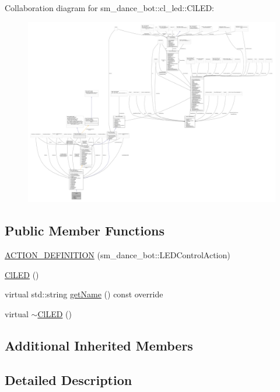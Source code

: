 Collaboration diagram for sm\+\_\+dance\+\_\+bot\+:\+:cl\+\_\+led\+:\+:Cl\+L\+ED\+:
\nopagebreak
\begin{figure}[H]
\begin{center}
\leavevmode
\includegraphics[width=350pt]{classsm__dance__bot_1_1cl__led_1_1ClLED__coll__graph}
\end{center}
\end{figure}
\subsection*{Public Member Functions}
\begin{DoxyCompactItemize}
\item 
\hyperlink{classsm__dance__bot_1_1cl__led_1_1ClLED_a810154a450e6239169177a43e7d17394}{A\+C\+T\+I\+O\+N\+\_\+\+D\+E\+F\+I\+N\+I\+T\+I\+ON} (sm\+\_\+dance\+\_\+bot\+::\+L\+E\+D\+Control\+Action)
\item 
\hyperlink{classsm__dance__bot_1_1cl__led_1_1ClLED_a6b01355fcaf2817d9f9694dc2d8c713c}{Cl\+L\+ED} ()
\item 
virtual std\+::string \hyperlink{classsm__dance__bot_1_1cl__led_1_1ClLED_aa0a9fb92df96fb1bbba35c78fbe4119d}{get\+Name} () const override
\item 
virtual \hyperlink{classsm__dance__bot_1_1cl__led_1_1ClLED_add9ff40d28e1d31d77e1a2ff92e79fd2}{$\sim$\+Cl\+L\+ED} ()
\end{DoxyCompactItemize}
\subsection*{Additional Inherited Members}


\subsection{Detailed Description}


